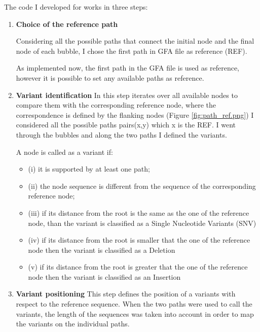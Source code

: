 \noindent
The code I developed for \bbc works in three steps:

\begin{enumerate}
\item\textbf{Choice of the reference path}

Considering all the possible paths that connect the initial node and the final node of each bubble, I chose the first path in GFA file as reference (REF).

As implemented now, the first path in the GFA file is used as reference, however it is possible to set any available paths as reference.

\item\textbf{Variant identification} In this step \bbc iterates over all available nodes to compare them with the corresponding reference node, where the correspondence is defined by the flanking nodes (Figure \ref{fig:path_ref.png})
I considered all the possible paths pairs(x,y) which x is the REF. I went through the bubbles and along the two paths I defined the variants.

A node is called as a variant if: 
\begin{itemize}
    \item (i) it is supported by at least one path; 
    \item (ii) the node sequence is different from the sequence of the corresponding reference node; 
    \item (iii) if its distance from the root is the same as the one of the reference node, than the variant is classified as a Single Nucleotide Variants (SNV)
    \item (iv) if its distance from the root is smaller that the one of the reference node then the variant is classified as a Deletion  
    \item (v) if its distance from the root is greater that the one of the reference node then the variant is classified as an Insertion
\end{itemize}

\item \textbf{Variant positioning} This step defines the position of a variants with respect to the reference sequence. When the two paths were used to call the variants, the length of the sequences was taken into account in order to map the variants on the individual paths.%
\end{enumerate} 

